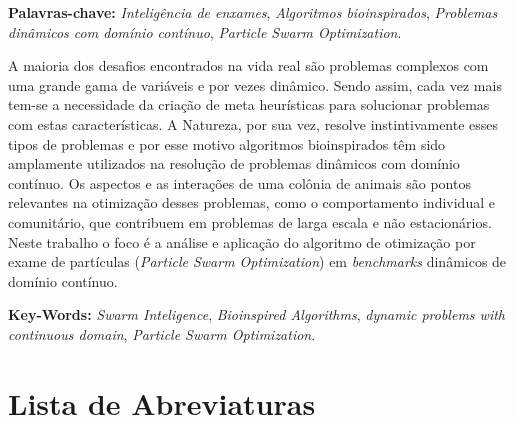 \noindent \textbf{Palavras-chave:} \textit{Inteligência de enxames}, \textit{Algoritmos bioinspirados}, \textit{Problemas dinâmicos com domínio contínuo}, \textit{Particle Swarm Optimization}.


A maioria dos desafios encontrados na vida real são problemas complexos com uma grande gama de variáveis e por vezes dinâmico. Sendo assim, cada vez mais tem-se a necessidade da criação de meta heurísticas para solucionar problemas com estas características. A Natureza, por sua vez, resolve instintivamente esses tipos de problemas e por esse motivo algoritmos bioinspirados têm sido amplamente utilizados na resolução de problemas dinâmicos com domínio contínuo. Os aspectos e as interações de uma colônia de animais são pontos relevantes na otimização desses problemas, como o comportamento individual e comunitário, que contribuem em problemas de larga escala e não estacionários. Neste trabalho o foco é a análise e aplicação do algoritmo de otimização por exame de partículas (\textit{Particle Swarm Optimization}) em \textit{benchmarks} dinâmicos de domínio contínuo.

\noindent \textbf{Key-Words:} \textit{Swarm Inteligence}, \textit{Bioinspired Algorithms}, \textit{dynamic problems with continuous domain}, \textit{Particle Swarm Optimization}.

\tableofcontents
\listoffigures
\listoftables
\newpage
\chapter*{Lista de Abreviaturas\hfill} 
\listofsymbols

\newpage
\pagestyle{myheadings}

